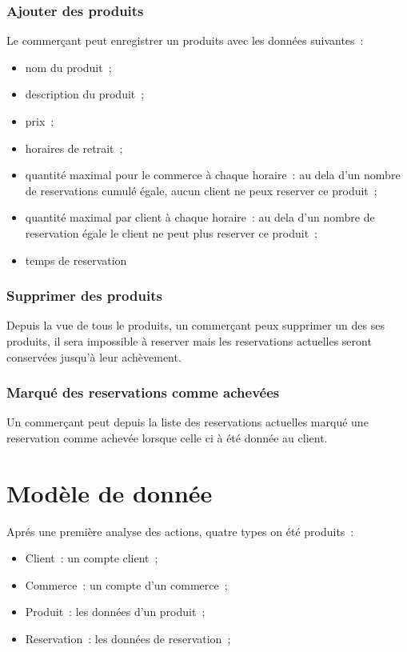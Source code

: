 \documentclass[a4paper,12pt]{article}
\begin{document}
\subsubsection{Ajouter des produits}

Le commerçant peut enregistrer un produits avec les données suivantes~:

\begin{itemize}
	\item nom du produit~;
	\item description du produit~;
	\item prix~;
	\item horaires de retrait~;
	\item quantité maximal pour le commerce à chaque horaire~: au dela d'un nombre de reservations cumulé égale, aucun client ne peux reserver ce produit~;
	\item quantité maximal par client à chaque horaire~: au dela d'un nombre de reservation égale le client ne peut plus reserver ce produit~;
	\item temps de reservation 
\end{itemize}


\subsubsection{Supprimer des produits}

Depuis la vue de tous le produits, un commerçant peux supprimer un des ses produits, il sera impossible à reserver mais les reservations actuelles seront conservées jusqu'à leur achèvement.

\subsubsection{Marqué des reservations comme achevées}

Un commerçant peut depuis la liste des reservations actuelles marqué une reservation comme achevée lorsque celle ci à été donnée au client.

\section{Modèle de donnée}

Aprés une première analyse des actions, quatre types on été produits~:
\begin{itemize}
	\item Client~: un compte client~;
	\item Commerce~: un compte d'un commerce~;
	\item Produit~: les données d'un produit~;
	\item Reservation~: les données de reservation~;
\end{itemize}
\end{document}
